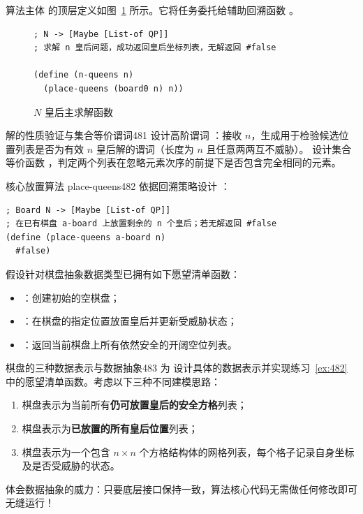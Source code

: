 算法主体  的顶层定义如图~\ref{fig:n-queens-code} 所示。它将任务委托给辅助回溯函数 。

\begin{figure}[htbp]
  \centering
\begin{lstlisting}[language=BSL]
; N -> [Maybe [List-of QP]]
; 求解 n 皇后问题，成功返回皇后坐标列表，无解返回 #false

(define (n-queens n)
  (place-queens (board0 n) n))
\end{lstlisting}
  \caption{$N$ 皇后主求解函数}
  \label{fig:n-queens-code}
\end{figure}

\begin{exercise}{解的性质验证与集合等价谓词}{481}\label{ex:481}
设计高阶谓词 ：接收 $n$，生成用于检验候选位置列表是否为有效 $n$ 皇后解的谓词（长度为 $n$ 且任意两两互不威胁）。
设计集合等价函数 ，判定两个列表在忽略元素次序的前提下是否包含完全相同的元素。
\end{exercise}

\begin{exercise}{核心放置算法 place-queens}{482}\label{ex:482}
依据回溯策略设计 ：
\begin{lstlisting}[language=BSL]
; Board N -> [Maybe [List-of QP]]
; 在已有棋盘 a-board 上放置剩余的 n 个皇后；若无解返回 #false
(define (place-queens a-board n)
  #false)
\end{lstlisting}
假设针对棋盘抽象数据类型已拥有如下愿望清单函数：
\begin{itemize}
  \item {}：创建初始的空棋盘；
  \item {}：在棋盘的指定位置放置皇后并更新受威胁状态；
  \item {}：返回当前棋盘上所有依然安全的开阔空位列表。
\end{itemize}
\end{exercise}

\begin{exercise}{棋盘的三种数据表示与数据抽象}{483}\label{ex:483}
为  设计具体的数据表示并实现练习~\ref{ex:482} 中的愿望清单函数。考虑以下三种不同建模思路：
\begin{enumerate}
  \item 棋盘表示为当前所有\textbf{仍可放置皇后的安全方格}列表；
  \item 棋盘表示为\textbf{已放置的所有皇后位置}列表；
  \item 棋盘表示为一个包含 $n \times n$ 个方格结构体的网格列表，每个格子记录自身坐标及是否受威胁的状态。
\end{enumerate}
体会数据抽象的威力：只要底层接口保持一致，算法核心代码无需做任何修改即可无缝运行！
\end{exercise}
